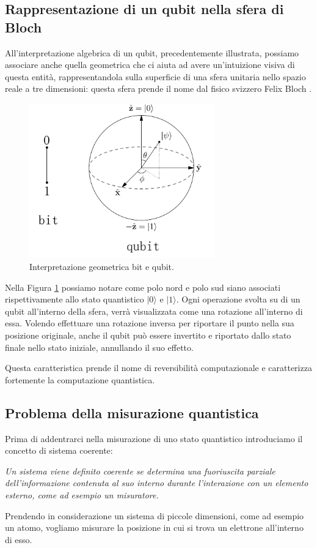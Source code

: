 \subsection{Rappresentazione di un qubit nella sfera di Bloch}
All'interpretazione algebrica di un qubit, precedentemente illustrata, possiamo associare anche quella geometrica che ci aiuta ad avere un'intuizione visiva di questa entità, rappresentandola sulla superficie di una sfera unitaria nello spazio reale a tre dimensioni: questa sfera prende il nome dal fisico svizzero Felix Bloch \cite{dipierro2013articolo}.
\begin{figure}[htp]
    \centering
    \includegraphics[width=8cm]{Images/Capitolo2/sfera_bloch.png}
    \caption{Interpretazione geometrica bit e qubit.}
    \label{fig:sfera_bloch}
\end{figure}
\newline

Nella Figura \ref{fig:sfera_bloch} possiamo notare come polo nord e polo sud siano associati rispettivamente allo stato quantistico $|0\rangle$ e $|1\rangle$.
Ogni operazione svolta su di un qubit all'interno della sfera, verrà visualizzata come una rotazione all'interno di essa.
Volendo effettuare una rotazione inversa per riportare il punto nella sua posizione originale, anche il qubit può essere invertito e riportato dallo stato finale nello stato iniziale, annullando il suo effetto.

Questa caratteristica prende il nome di reversibilità computazionale e caratterizza fortemente la computazione quantistica.

\subsection{Problema della misurazione quantistica}
Prima di addentrarci nella misurazione di uno stato quantistico introduciamo il concetto di sistema coerente:
\begin{center}
\textit{Un sistema viene definito coerente se determina una fuoriuscita parziale dell'informazione contenuta al suo interno durante l'interazione con un elemento esterno, come ad esempio un misuratore.} \cite{dipierro2013articolo}
\end{center}
Prendendo in considerazione un sistema di piccole dimensioni, come ad esempio un atomo, vogliamo misurare la posizione in cui si trova un elettrone all'interno di esso.

